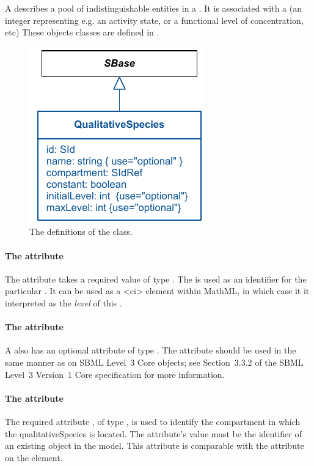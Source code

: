 A \QualitativeSpecies describes a pool of indistinguishable entities in a . It is associated with  a  (an integer representing e.g. an activity state, or a functional level of concentration, etc)  %
 These objects classes are defined in .
\begin{figure}[h]
  \includegraphics{figs/qual-qualitative-species-uml.pdf}
  \caption{The definitions of the \QualitativeSpecies class. }
  \label{qual-qualitative-species-uml}
\end{figure}

\paragraph{The \fixttspace{} attribute}

The  attribute takes a required value
of type . The  is used as an identifier for the particular \QualitativeSpecies. It can be used as a 
<ci> element within MathML, in which case it it interpreted as the \emph{level} of this \QualitativeSpecies.

\paragraph{The \fixttspace{} attribute}

A \QualitativeSpecies also has an optional  attribute of type . 
 The  attribute should be used
in the same manner as on SBML Level~3 Core
objects; see Section~3.3.2 of the SBML Level~3 Version~1 Core
specification for more information.


\paragraph{The  attribute}
The required attribute , of type , is used to identify the compartment in which the qualitativeSpecies is located.  The attribute's value must be the identifier of an existing  object in the model.  This attribute is comparable with the  attribute on the  element.

